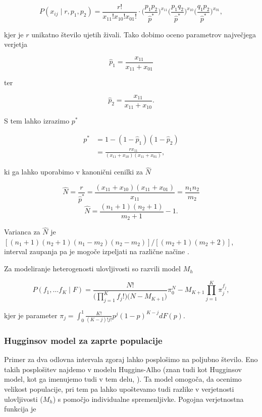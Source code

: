\[
P(x_{ij} \mid r, p_1, p_2) = \frac{r!}{x_{11}! x_{10}! x_{01}!} \cdot \Big(\frac{p_1 p_2}{\hat{p}^{*}}\Big)^{x_{11}} \Big(\frac{p_1 q_2}{\hat{p}^{*}}\Big)^{x_{10}} \Big(\frac{q_1 p_2}{\hat{p}^{*}}\Big)^{x_{01}},
\]

kjer je $r$ unikatno število ujetih živali. Tako dobimo oceno parametrov največjega verjetja


\[
\hat{p}_1 = \frac{x_{11}}{x_{11} + x_{01}}
\]

ter

\[
\hat{p}_2 = \frac{x_{11}}{x_{11} + x_{10}}.
\]

S tem lahko izrazimo $p^{*}$

\begin{align*}
p^* &= 1 - (1-\hat{p}_1)(1-\hat{p}_2) \\[5pt]
    &= \frac{r x_{11}}{(x_{11} + x_{10})(x_{11} + x_{01})},
\end{align*}

ki ga lahko uporabimo v kanonični cenilki za $\hat{N}$

\[
\hat{N} = \frac{r}{\hat{p}^{*}} = \frac{(x_{11} + x_{10})(x_{11} + x_{01})}{x_{11}} = \frac{n_1 n_2}{m_2}
\]
\[
\hat{N} = \frac{(n_1 + 1)(n_2 + 1)}{m_2 + 1} - 1.
\]

Varianca za $\hat{N}$ je $[(n_1 + 1)(n_2 + 1)(n_1 - m_2)(n_2 - m_2)]/[(m_2 + 1)(m_2 + 2)]$, interval zaupanja pa je mogoče izpeljati na različne načine \citep{williams_analysis_2002}.

Za modeliranje heterogenosti ulovljivosti so razvili model $M_h$ \citep{otis_statistical_1978}

\[
P(f_1, \ldots f_K \mid F) = \frac{N!}{\big(\prod_{j=1}^{K} f_j !\big)\big(N - M_{K+1}\big)} \pi_{0}^N-M_{K+1} \prod_{j=1}^{K} \pi_{j}^{f_j},
\]

kjer je parameter $\pi_j = \int_{0}^{1} \frac{K!}{(K-j)!j!} p^j (1-p)^{K-j} dF(p)$.


\subsubsection[\bfseries Hugginsov model za zaprte populacije]{Hugginsov model za zaprte populacije}
Primer za dva odlovna intervala zgoraj lahko posplošimo na poljubno število. Eno takih posplošitev najdemo v modelu Huggins-Alho (znan tudi kot Hugginsov model, kot ga imenujemo tudi v tem delu, \citet{huggins_statistical_1989}). Ta model omogoča, da ocenimo velikost populacije, pri tem pa lahko upoštevamo tudi razlike v verjetnosti ulovljivosti ($M_h$) s pomočjo individualne spremenljivke. Pogojna verjetnostna funkcija je

